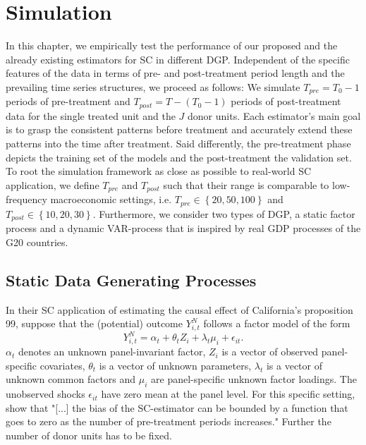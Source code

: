 \section{Simulation}
In this chapter, we empirically test the performance of our proposed and the already existing estimators for \ac{SC} in different \ac{DGP}. Independent of the specific features of the data in terms of pre- and post-treatment period length and the prevailing time series structures, we proceed as follows: We simulate $T_{pre} = T_0 -1$ periods of pre-treatment and $T_{post} = T - (T_0 -1)$ periods of post-treatment data for the single treated unit and the $J$ donor units. Each estimator's main goal is to grasp the consistent patterns before treatment and accurately extend these patterns into the time after treatment. Said differently, the pre-treatment phase depicts the training set of the models and the post-treatment the validation set. To root the simulation framework as close as possible to real-world \ac{SC} application, we define $T_{pre}$ and $T_{post}$ such that their range is comparable to low-frequency macroeconomic settings, i.e. $T_{pre} \in \left\lbrace 20,50,100\right\rbrace $ and $T_{post} \in \left\lbrace 10,20,30\right\rbrace$. Furthermore, we consider two types of \ac{DGP}, a static factor process and a dynamic \ac{VAR}-process that is inspired by real \ac{GDP} processes of the G20 countries.

\subsection{Static Data Generating Processes}

In their \ac{SC} application of estimating the causal effect of California's proposition 99, \cite{abadie:2010} suppose that the (potential) outcome $Y_{i,t}^{N}$ follows a factor model of the  form 
\begin{equation*}
	Y_{i,t}^{N} = \alpha_t + \theta_t Z_i + \lambda_t \mu_i + \epsilon_{it}.
\end{equation*}
$\alpha_t$ denotes an unknown panel-invariant factor, $Z_i$ is a vector of observed panel-specific covariates, $\theta_t$ is a vector of unknown parameters, $\lambda_t$ is a vector of unknown common factors and $\mu_i$ are panel-specific unknown factor loadings. The unobserved shocks $\epsilon_{it}$ have zero mean at the panel level. 
For this specific setting, \cite{abadie:2010} show that "[...] the bias of the SC-estimator can be bounded by a function that goes to zero as the number of pre-treatment periods increases." Further the number of donor units has to be fixed.

